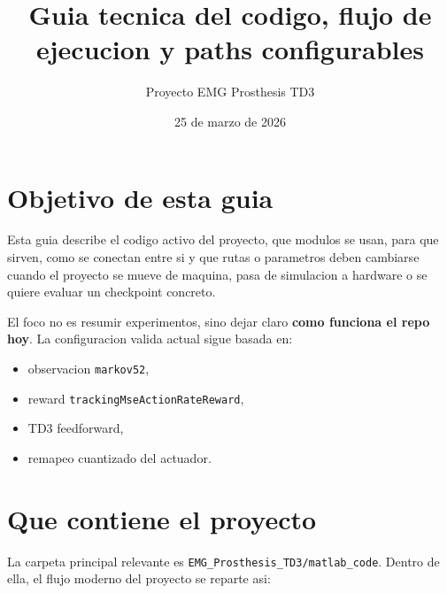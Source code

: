 \documentclass[11pt,a4paper]{article}
\title{Guia tecnica del codigo, flujo de ejecucion y paths configurables}
\author{Proyecto EMG Prosthesis TD3}
\date{25 de marzo de 2026}
\begin{document}
\maketitle

\section{Objetivo de esta guia}

Esta guia describe el codigo activo del proyecto, que modulos se usan, para que sirven, como se conectan entre si y que rutas o parametros deben cambiarse cuando el proyecto se mueve de maquina, pasa de simulacion a hardware o se quiere evaluar un checkpoint concreto.

El foco no es resumir experimentos, sino dejar claro \textbf{como funciona el repo hoy}. La configuracion valida actual sigue basada en:

\begin{itemize}
\item observacion \texttt{markov52},
\item reward \texttt{trackingMseActionRateReward},
\item TD3 feedforward,
\item remapeo cuantizado del actuador.
\end{itemize}

\section{Que contiene el proyecto}

La carpeta principal relevante es \texttt{EMG\_Prosthesis\_TD3/matlab\_code}. Dentro de ella, el flujo moderno del proyecto se reparte asi:
\end{document}
